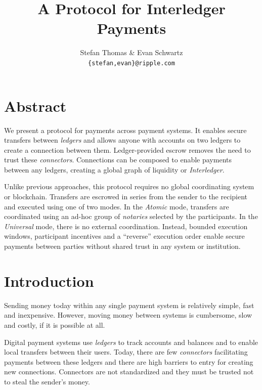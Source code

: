 \documentclass[letterpaper,twocolumn,10pt]{article}
\begin{document}
\title{\Large \bf A Protocol for Interledger Payments}

\author{
\textnormal{Stefan Thomas \& Evan Schwartz} \\
\textnormal{\texttt{\{stefan,evan\}@ripple.com}}
}

\maketitle

\thispagestyle{empty}
\section*{Abstract}

We present a protocol for payments across payment systems. It enables secure transfers between \textit{ledgers} and allows anyone with accounts on two ledgers to create a connection between them. Ledger-provided escrow removes the need to trust these \textit{connectors}. Connections can be composed to enable payments between any ledgers, creating a global graph of liquidity or \mbox{\textit{Interledger}}.

Unlike previous approaches, this protocol requires no global coordinating system or blockchain. Transfers are escrowed in series from the sender to the recipient and executed using one of two modes. In the \textit{Atomic} mode, transfers are coordinated using an ad-hoc group of \textit{notaries} selected by the participants. In the \textit{Universal} mode, there is no external coordination. Instead, bounded execution windows, participant incentives and a \mbox{``reverse''} execution order enable secure payments between parties without shared trust in any system or institution.


\section{Introduction}

Sending money today within any single payment system is relatively simple, fast and inexpensive. However, moving money between systems is cumbersome, slow and costly, if it is possible at all.

Digital payment systems use \textit{ledgers} to track accounts and balances and to enable local transfers between their users. Today, there are few \textit{connectors} facilitating payments between these ledgers and there are high barriers to entry for creating new connections. Connectors are not standardized and they must be trusted not to steal the sender's money.
\end{document}
